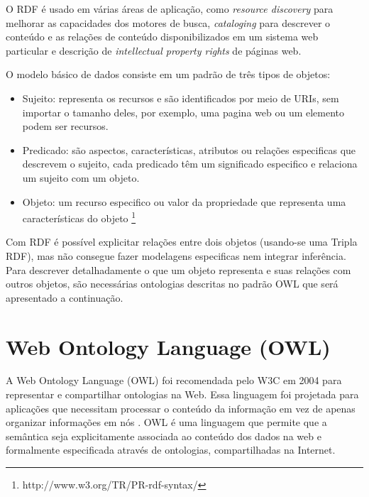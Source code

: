 O \foreignlanguage{english}{RDF} é usado em várias áreas de aplicação,
como \foreignlanguage{english}{\emph{resource discovery}} para melhorar
as capacidades dos motores de busca, \foreignlanguage{english}{\emph{cataloging}}
para descrever o conteúdo e as relações de conteúdo disponibilizados
em um sistema web particular e descrição de \foreignlanguage{english}{\emph{intellectual
property rights}} de páginas web.

O modelo básico de dados consiste em um padrão de três tipos de objetos:
\begin{itemize}
\item Sujeito: representa os recursos e são identificados por meio de \foreignlanguage{english}{URIs},
sem importar o tamanho deles, por exemplo, uma pagina web ou um elemento
 podem ser recursos.
\item Predicado: são aspectos, características, atributos ou relações especificas
que descrevem o sujeito, cada predicado têm um significado especifico
e relaciona um sujeito com um objeto.
\item Objeto: um recurso especifico ou valor da propriedade que representa
uma características do objeto \footnote{http://www.w3.org/TR/PR-rdf-syntax/}
\end{itemize}
Com \foreignlanguage{english}{RDF} é possível explicitar relações
entre dois objetos (usando-se uma Tripla \foreignlanguage{english}{RDF}),
mas não consegue fazer modelagens especificas nem integrar inferência.
Para descrever detalhadamente o que um objeto representa e suas relações
com outros objetos, são necessárias ontologias descritas no padrão
\foreignlanguage{english}{OWL} que será apresentado a continuação. 
%

\section{Web Ontology Language\foreignlanguage{brazil}{ (}OWL\foreignlanguage{brazil}{)}}

%
A \foreignlanguage{english}{Web Ontology Language} (\foreignlanguage{english}{OWL})
foi recomendada pelo W3C em 2004 para representar e compartilhar ontologias
na Web. Essa linguagem foi projetada para aplicações que necessitam
processar o conteúdo da informação em vez de apenas organizar informações
em nós \citet{mcguinness2004owl}. \foreignlanguage{english}{OWL}
é uma linguagem que permite que a semântica seja explicitamente associada
ao conteúdo dos dados na web e formalmente especificada através de
ontologias, compartilhadas na Internet. 

